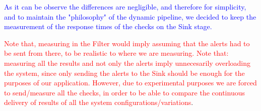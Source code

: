 \documentclass[12pt,a4paper]{article}
\begin{document}
\textcolor{blue}{As it can be observe the differences are negligible, and therefore for simplicity, and to maintain the "philosophy" of the dynamic pipeline, we decided to keep the measurement of the response times of the checks on the Sink stage.}

\textcolor{red}{Note that, measuring in the Filter would imply assuming that the alerts had to be sent from there, to be realistic to where we are measuring.}
\textcolor{red}{Note that: measuring all the results and not only the alerts imply unnecesarily overloading the system, since only sending the alerts to the Sink should be enough for the purposes of our application. However, due to experimental purposes we are forced to send/measure all the checks, in order to be able to compare the continuous delivery of results of all the system configurations/variations}.
\end{document}
